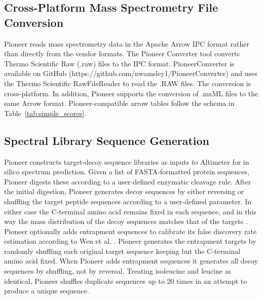 \documentclass[pdflatex,sn-nature]{sn-jnl}
\begin{document}


\subsection{Cross-Platform Mass Spectrometry File Conversion}\label{subsec1}

Pioneer reads mass spectrometry data in the Apache Arrow IPC format rather than directly from the vendor formats. The Pioneer Converter tool converts Thermo Scientific Raw (.raw) files to the IPC format. PioneerConverter is available on GitHub (https://github.com/nwamsley1/PioneerConverter) and uses the Thermo Scientific RawFileReader to read the .RAW files. The conversion is cross-platform. In addition, Pioneer supports the conversion of .mzML files to the same Arrow format. Pioneer-compatible arrow tables follow the schema in Table~\ref{tab:simple_scores}. 

\subsection{Spectral Library Sequence Generation}\label{subsec2}
Pioneer constructs target-decoy sequence libraries as inputs to Altimeter for in silico spectrum prediction. Given a list of FASTA-formatted protein sequences, Pioneer digests these according to a user-defined enzymatic cleavage rule. After the initial digestion, Pioneer generates decoy sequences by either reversing or shuffling the target peptide sequences according to a user-defined parameter. In either case the C-terminal amino acid remains fixed in each sequence, and in this way the mass distribution of the decoy sequences matches that of the targets \cite{Freestone2023-ef}. Pioneer optionally adds entrapment sequences to calibrate its false discovery rate estimation according to Wen et al. \cite{Wen2024-jv}. Pioneer generates the entrapment targets by randomly shuffling each original target sequence keeping but the C-terminal amino acid fixed. When Pioneer adds entrapment sequences it generates all decoy sequences by shuffling, not by reversal. Treating isoleucine and leucine as identical, Pioneer shuffles duplicate sequences up to 20 times in an attempt to produce a unique sequence. 
\end{document}
